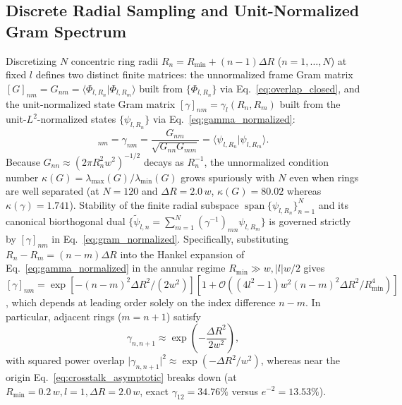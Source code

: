 \documentclass[aps,pra,onecolumn,notitlepage,11pt,tightenlines,nofootinbib,floatfix,longbibliography]{revtex4-2}
\theoremstyle{remark}
\newcommand{\braket}[2]{\langle #1 | #2 \rangle}
\newcommand{\abs}[1]{\lvert #1 \rvert}
\begin{document}
\subsection{Discrete Radial Sampling and Unit-Normalized Gram Spectrum}
\label{subsec:gram_sampling}

Discretizing $N$ concentric ring radii $R_n = R_{\min} + (n-1)\Delta R$ ($n = 1,\dots,N$) at fixed $l$ defines two distinct finite matrices: the unnormalized frame Gram matrix $[G]_{nm} = G_{nm} = \braket{\Phi_{l,R_n}}{\Phi_{l,R_m}}$ built from $\{\Phi_{l,R_n}\}$ via Eq.~\eqref{eq:overlap_closed}, and the unit-normalized state Gram matrix $[\gamma]_{nm} = \gamma_l(R_n,R_m)$ built from the unit-$L^2$-normalized states $\{\psi_{l,R_n}\}$ via Eq.~\eqref{eq:gamma_normalized}:
\begin{equation}
[\gamma]_{nm} = \gamma_{nm} = \frac{G_{nm}}{\sqrt{G_{nn} G_{mm}}} = \braket{\psi_{l,R_n}}{\psi_{l,R_m}}.
\label{eq:gram_normalized}
\end{equation}
Because $G_{nn} \approx (2\pi R_n^2 w^2)^{-1/2}$ decays as $R_n^{-1}$, the unnormalized condition number $\kappa(G) = \lambda_{\max}(G)/\lambda_{\min}(G)$ grows spuriously with $N$ even when rings are well separated (at $N = 120$ and $\Delta R = 2.0\,w$, $\kappa(G) = 80.02$ whereas $\kappa(\gamma) = 1.741$). Stability of the finite radial subspace $\operatorname{span}\{\psi_{l,R_n}\}_{n=1}^N$ and its canonical biorthogonal dual $\{\tilde{\psi}_{l,n} = \sum_{m=1}^N (\gamma^{-1})_{mn}\psi_{l,R_m}\}$ is governed strictly by $[\gamma]_{nm}$ in Eq.~\eqref{eq:gram_normalized}. Specifically, substituting $R_n - R_m = (n-m)\Delta R$ into the Hankel expansion of Eq.~\eqref{eq:gamma_normalized} in the annular regime $R_{\min} \gg w, \abs{l}w/2$ gives $[\gamma]_{nm} = \exp[-(n-m)^2\Delta R^2/(2w^2)][1 + \mathcal{O}((4l^2-1)w^2(n-m)^2\Delta R^2/R_{\min}^4)]$, which depends at leading order solely on the index difference $n - m$. In particular, adjacent rings ($m = n+1$) satisfy
\begin{equation}
\gamma_{n,n+1} \approx \exp\!\left(-\frac{\Delta R^2}{2w^2}\right),
\label{eq:crosstalk_asymptotic}
\end{equation}
with squared power overlap $\abs{\gamma_{n,n+1}}^2 \approx \exp(-\Delta R^2/w^2)$, whereas near the origin Eq.~\eqref{eq:crosstalk_asymptotic} breaks down (at $R_{\min} = 0.2\,w, l = 1, \Delta R = 2.0\,w$, exact $\gamma_{12} = 34.76\%$ versus $e^{-2} = 13.53\%$).
\end{document}
